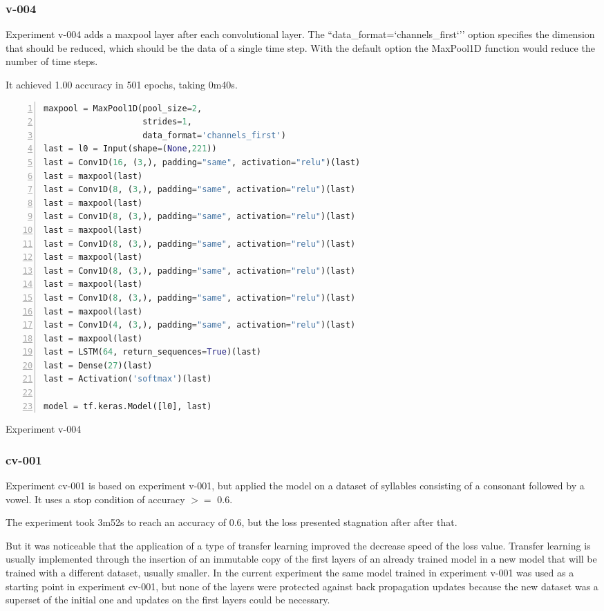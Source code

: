 \subsubsection{v-004}
Experiment v-004 adds a maxpool layer after each convolutional layer. The ``data\_format=`channels\_first`'' option specifies the dimension that should be reduced, which should be the data of a single time step. With the default option the MaxPool1D function would reduce the number of time steps.

It achieved 1.00 accuracy in 501 epochs, taking 0m40s.

\noindent
\begin{algorithm}
\begin{lstlisting}[language=Python, frame=single, numbers=left]
maxpool = MaxPool1D(pool_size=2,
                    strides=1,
                    data_format='channels_first')
last = l0 = Input(shape=(None,221))
last = Conv1D(16, (3,), padding="same", activation="relu")(last)
last = maxpool(last)
last = Conv1D(8, (3,), padding="same", activation="relu")(last)
last = maxpool(last)
last = Conv1D(8, (3,), padding="same", activation="relu")(last)
last = maxpool(last)
last = Conv1D(8, (3,), padding="same", activation="relu")(last)
last = maxpool(last)
last = Conv1D(8, (3,), padding="same", activation="relu")(last)
last = maxpool(last)
last = Conv1D(8, (3,), padding="same", activation="relu")(last)
last = maxpool(last)
last = Conv1D(4, (3,), padding="same", activation="relu")(last)
last = maxpool(last)
last = LSTM(64, return_sequences=True)(last)
last = Dense(27)(last)
last = Activation('softmax')(last)

model = tf.keras.Model([l0], last)
\end{lstlisting}
\caption{\label{alg:v004}Experiment v-004}
\end{algorithm}

\subsubsection{cv-001}
Experiment cv-001 is based on experiment v-001, but applied the model on a dataset of syllables consisting of a consonant followed by a vowel. It uses a stop condition of accuracy $>=$ 0.6.

The experiment took 3m52s to reach an accuracy of 0.6, but the loss presented stagnation after after that.

But it was noticeable that the application of a type of transfer learning improved the decrease speed of the loss value. Transfer learning is usually implemented through the insertion of an immutable copy of the first layers of an already trained model in a new model that will be trained with a different dataset, usually smaller. In the current experiment the same model trained in experiment v-001 was used as a starting point in experiment cv-001, but none of the layers were protected against back propagation updates because the new dataset was a superset of the initial one and updates on the first layers could be necessary.

